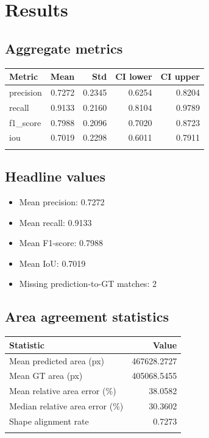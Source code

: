 \documentclass[11pt]{article}
\begin{document}
\section{Results}
\subsection{Aggregate metrics}
\begin{center}
\begin{tabular}{lrrrr}
\toprule
Metric & Mean & Std & CI lower & CI upper \\
\midrule
precision & 0.7272 & 0.2345 & 0.6254 & 0.8204 \\
recall & 0.9133 & 0.2160 & 0.8104 & 0.9789 \\
f1\_score & 0.7988 & 0.2096 & 0.7020 & 0.8723 \\
iou & 0.7019 & 0.2298 & 0.6011 & 0.7911 \\
\\
\bottomrule
\end{tabular}
\end{center}

\subsection{Headline values}
\begin{itemize}
\item Mean precision: 0.7272
\item Mean recall: 0.9133
\item Mean F1-score: 0.7988
\item Mean IoU: 0.7019
\item Missing prediction-to-GT matches: 2
\end{itemize}

\subsection{Area agreement statistics}
\begin{center}
\begin{tabular}{lr}
\toprule
Statistic & Value \\
\midrule
Mean predicted area (px) & 467628.2727 \\
Mean GT area (px) & 405068.5455 \\
Mean relative area error (\%) & 38.0582 \\
Median relative area error (\%) & 30.3602 \\
Shape alignment rate & 0.7273 \\
\\
\bottomrule
\end{tabular}
\end{center}
\end{document}
